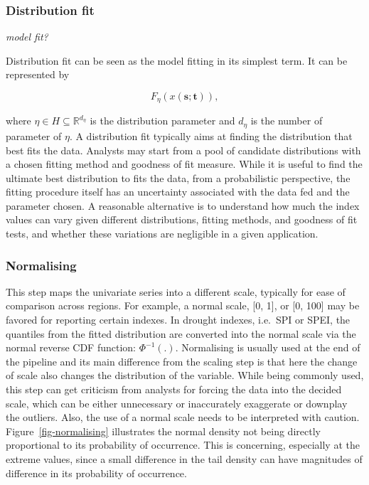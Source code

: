 \documentclass[
]{interact}
\begin{document}
\hypertarget{distribution-fit}{%
\subsubsection{Distribution fit}\label{distribution-fit}}

\emph{model fit? }

Distribution fit can be seen as the model fitting in its simplest term.
It can be represented by

\begin{equation}
F_{\eta}(x(\mathbf{s}; \mathbf{t})), 
\end{equation}

where \(\eta \in H \subseteq \mathbb{R}^{d_{\eta}}\) is the distribution
parameter and \(d_{\eta}\) is the number of parameter of \(\eta\). A
distribution fit typically aims at finding the distribution that best
fits the data. Analysts may start from a pool of candidate distributions
with a chosen fitting method and goodness of fit measure. While it is
useful to find the ultimate best distribution to fits the data, from a
probabilistic perspective, the fitting procedure itself has an
uncertainty associated with the data fed and the parameter chosen. A
reasonable alternative is to understand how much the index values can
vary given different distributions, fitting methods, and goodness of fit
tests, and whether these variations are negligible in a given
application.

\hypertarget{normalising}{%
\subsubsection{Normalising}\label{normalising}}

This step maps the univariate series into a different scale, typically
for ease of comparison across regions. For example, a normal scale,
{[}0, 1{]}, or {[}0, 100{]} may be favored for reporting certain
indexes. In drought indexes, i.e.~SPI or SPEI, the quantiles from the
fitted distribution are converted into the normal scale via the normal
reverse CDF function: \(\Phi^{-1}(.)\). Normalising is usually used at
the end of the pipeline and its main difference from the scaling step is
that here the change of scale also changes the distribution of the
variable. While being commonly used, this step can get criticism from
analysts for forcing the data into the decided scale, which can be
either unnecessary or inaccurately exaggerate or downplay the outliers.
Also, the use of a normal scale needs to be interpreted with caution.
Figure~\ref{fig-normalising} illustrates the normal density not being
directly proportional to its probability of occurrence. This is
concerning, especially at the extreme values, since a small difference
in the tail density can have magnitudes of difference in its probability
of occurrence.
\end{document}
